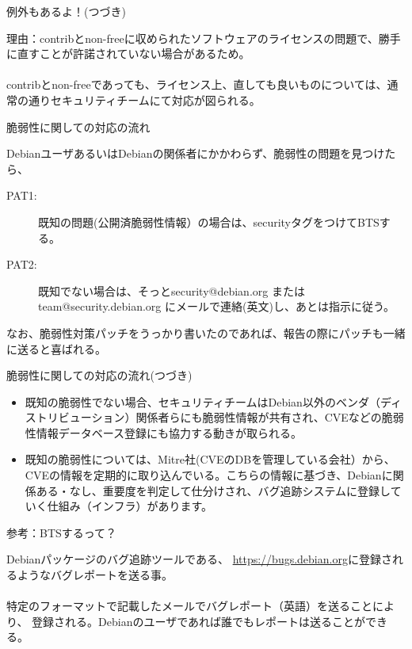 \begin{frame}{例外もあるよ！(つづき)}

  理由：contribとnon-freeに収められたソフトウェアのライセンスの問題で、勝手に直すことが許諾されていない場合があるため。\\
\ \\
  contribとnon-freeであっても、ライセンス上、直しても良いものについては、通常の通りセキュリティチームにて対応が図られる。  

\end{frame}

\begin{frame}{脆弱性に関しての対応の流れ}

 DebianユーザあるいはDebianの関係者にかかわらず、脆弱性の問題を見つけたら、
\begin{description}
\item [PAT1:] 既知の問題(公開済脆弱性情報）の場合は、securityタグをつけてBTSする。
\item [PAT2:] 既知でない場合は、そっとsecurity@debian.org またはteam@security.debian.org にメールで連絡(英文)し、あとは指示に従う。
\end{description}

なお、脆弱性対策パッチをうっかり書いたのであれば、報告の際にパッチも一緒に送ると喜ばれる。
  
\end{frame}

\begin{frame}{脆弱性に関しての対応の流れ(つづき)}

\begin{itemize}
\item 既知の脆弱性でない場合、セキュリティチームはDebian以外のベンダ（ディストリビューション）関係者らにも脆弱性情報が共有され、CVEなどの脆弱性情報データベース登録にも協力する動きが取られる。
\item 既知の脆弱性については、Mitre社(CVEのDBを管理している会社）から、CVEの情報を定期的に取り込んでいる。こちらの情報に基づき、Debianに関係ある・なし、重要度を判定して仕分けされ、バグ追跡システムに登録していく仕組み（インフラ）があります。
\end{itemize}
\end{frame}

\begin{frame}{参考：BTSするって？}

Debianパッケージのバグ追跡ツールである、
\url{https://bugs.debian.org}に登録されるようなバグレポートを送る事。\\
\ \\
特定のフォーマットで記載したメールでバグレポート（英語）を送ることにより、
登録される。Debianのユーザであれば誰でもレポートは送ることができる。

\end{frame}  

